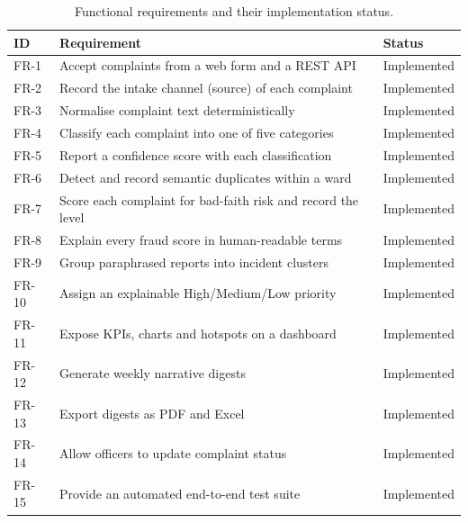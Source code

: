 \documentclass[10pt,letterpaper,oneside]{article}\usepackage{geometry}\geometry{top=1in,bottom=1in,left=1in,right=1in,includeheadfoot}\usepackage{xcolor}\definecolor{color@navy}{HTML}{1F3B63}\definecolor{color@grey}{HTML}{404040}\definecolor{color@hdr}{HTML}{F2F4F7}\usepackage{titlesec}\titleformat{\section}  {\normalfont\huge\bfseries\color@navy}  {}{0pt}{\MakeUppercase}\titleformat{\subsection}  {\normalfont\Large\bfseries\color@navy}  {}{0pt}{}\titleformat{\subsubsection}  {\normalfont\large\bfseries\color@navy}  {}{0pt}{}\titlespacing*{\section}{0pt}{14pt}{6pt}\titlespacing*{\subsection}{0pt}{10pt}{4pt}\titlespacing*{\subsubsection}{0pt}{8pt}{3pt}\setlength{\parindent}{0pt}\setlength{\parskip}{0.6em}\parindent=0pt\usepackage{enumitem}\setlist{nosep,leftmargin=*,itemsep=0pt,topsep=2pt,partopsep=0pt}\usepackage{array}\usepackage{booktabs}\usepackage{caption}\captionsetup{font={small,it},labelfont={bf},labelsep=period,  parskip=2pt,skip=4pt,list=no}\captionsetup[table]{labelfont={bf,small,color@navy},name=Table}\usepackage{graphicx}\usepackage{verbatim}\usepackage{ragged2e}\usepackage{longtable}\usepackage{tabularx}\usepackage{multirow}\usepackage{colortbl}\definecolor{rowshade}{HTML}{F2F4F7}\usepackage{tikz}\usetikzlibrary{positioning,calc}\usepackage[hidelinks]{hyperref}\hypersetup{colorlinks=true,linkcolor=color@navy,urlcolor=color@navy}\pagestyle{fancy}\fancyhf{}\renewcommand{\headrulewidth}{0.4pt}\fancyhead[L]{\small\color@navy CivicSense — Project Report}\fancyhead[R]{\small\color@grey October 11, 2026}\fancyfoot[C]{\small\color@grey An Integrated Intelligent Triage Pipelin}\fancyfoot[R]{\small\color@grey Page \thepage}\usepackage{setspace}\setstretch{1.15}\AtBeginDocument{  \hypersetup{pdftitle={An Integrated Intelligent Triage Pipeline for AI-Enhanced Citizen Complaint Management},    pdfauthor={CivicSense Project Team},    pdfsubject={Project Report},    pdfkeywords={smart cities, NLP, complaint management, e-governance},    pdfcreator={CivicSense Project Team}  }}
\begin{document}
\begin{table}[htbp]
\centering
\small
\begin{tabular}{@{}lll@{}}
\toprule
ID & Requirement & Status \\
\midrule
FR-1 & Accept complaints from a web form and a REST API & Implemented \\
FR-2 & Record the intake channel (source) of each complaint & Implemented \\
FR-3 & Normalise complaint text deterministically & Implemented \\
FR-4 & Classify each complaint into one of five categories & Implemented \\
FR-5 & Report a confidence score with each classification & Implemented \\
FR-6 & Detect and record semantic duplicates within a ward & Implemented \\
FR-7 & Score each complaint for bad-faith risk and record the level & Implemented \\
FR-8 & Explain every fraud score in human-readable terms & Implemented \\
FR-9 & Group paraphrased reports into incident clusters & Implemented \\
FR-10 & Assign an explainable High/Medium/Low priority & Implemented \\
FR-11 & Expose KPIs, charts and hotspots on a dashboard & Implemented \\
FR-12 & Generate weekly narrative digests & Implemented \\
FR-13 & Export digests as PDF and Excel & Implemented \\
FR-14 & Allow officers to update complaint status & Implemented \\
FR-15 & Provide an automated end-to-end test suite & Implemented \\
\bottomrule
\end{tabular}
\caption{Functional requirements and their implementation status.}
\end{table}
\end{document}
